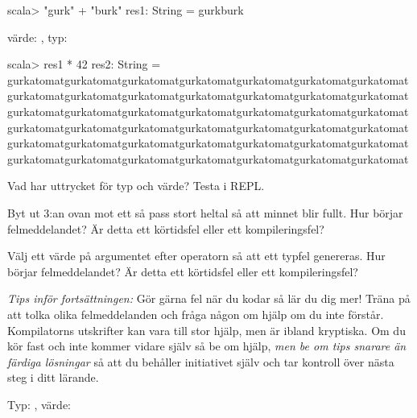 \SOLUTION

\TaskSolved \what

\SubtaskSolved
\begin{REPLnonum}
scala> "gurk" + "burk"
res1: String = gurkburk
\end{REPLnonum}
värde: , typ:  

\SubtaskSolved
\begin{REPLnonum}
scala> res1 * 42
res2: String = gurkatomatgurkatomatgurkatomatgurkatomatgurkatomatgurkatomatgurkatomatgurkatomatgurkatomatgurkatomatgurkatomatgurkatomatgurkatomatgurkatomatgurkatomatgurkatomatgurkatomatgurkatomatgurkatomatgurkatomatgurkatomatgurkatomatgurkatomatgurkatomatgurkatomatgurkatomatgurkatomatgurkatomatgurkatomatgurkatomatgurkatomatgurkatomatgurkatomatgurkatomatgurkatomatgurkatomatgurkatomatgurkatomatgurkatomatgurkatomatgurkatomatgurkatomat
\end{REPLnonum}

\QUESTEND





\QUESTBEGIN

\Task \what

\Subtask Vad har uttrycket  för typ och värde? Testa i REPL.

\Subtask Byt ut 3:an ovan mot ett så pass stort heltal så att minnet blir fullt. Hur börjar felmeddelandet? Är detta ett körtidsfel eller ett kompileringsfel?

\Subtask Välj ett värde på argumentet efter operatorn \code{*} så att ett typfel genereras. Hur börjar felmeddelandet? Är detta ett körtidsfel eller ett kompileringsfel?

\begin{framed}
\noindent\emph{Tips inför fortsättningen:} Gör gärna fel när du kodar så lär du dig mer! Träna på att tolka olika felmeddelanden och fråga någon om hjälp om du inte förstår. Kompilatorns utskrifter kan vara till stor hjälp, men är ibland kryptiska. Om du kör fast och inte kommer vidare själv så be om hjälp, \emph{men be om tips snarare än färdiga lösningar} så att du behåller initiativet själv och tar kontroll över nästa steg i ditt lärande.
\end{framed}


\SOLUTION

\TaskSolved \what

\SubtaskSolved Typ: , värde: 

